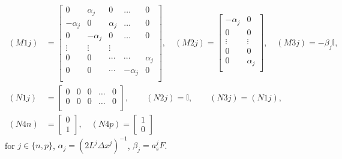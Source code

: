 \documentclass[12pt]{article}
\newcommand{\Id}{{\mathbb{I}}}
\begin{document}
\begin{align}
(M1j) &=
\left[
\begin{array}{ccccc}
 0 & \alpha_{j} & 0 & \ldots & 0  \\
 -\alpha_{j} & 0 & \alpha_{j} & \ldots & 0  \\
 0 & -\alpha_{j} & 0 & \ldots & 0  \\
 \vdots & \vdots & \vdots &  &  \\
 0 & 0 & \cdots & \cdots & \alpha_{j} \\
 0 & 0 & \cdots & -\alpha_{j} & 0 \\
\end{array}
\right], \quad
(M2j) =
\left[
\begin{array}{cc}
 -\alpha_{j} & 0  \\
 0 & 0 \\
 \vdots & \vdots  \\
 0 & 0 \\
 0 & \alpha_{j} \\
\end{array}
\right], \quad
(M3j) = -\beta_{j} \Id, \\
(N1j) &=
\left[
\begin{array}{ccccc}
 0 & 0 & 0 & \ldots & 0  \\
 0 & 0 & 0 & \ldots & 0  \\
\end{array}
\right], \qquad
(N2j) = \Id, \qquad
(N3j) = (N1j), \quad \\
(N4n) &= 
\left[
\begin{array}{c}
  0 \\
  1
\end{array}
\right], \quad
(N4p) = 
\left[
\begin{array}{c}
  1 \\
  0
\end{array}
\right]
\end{align}
for $j \in \{n,p\}$, $\alpha_{j} = (2 L^{j} \Delta x^{j})^{-1}$, $\beta_{j} = a_{s}^{j} F$.

\end{document}
